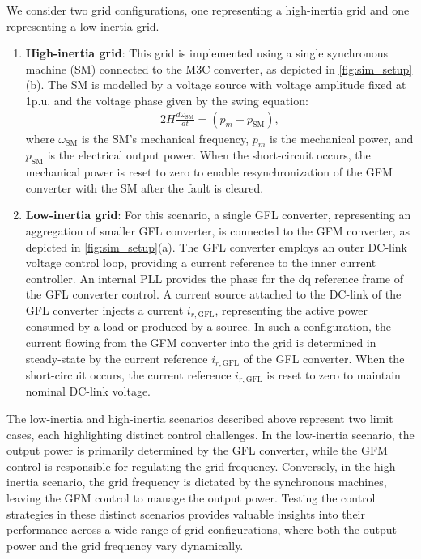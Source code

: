 \documentclass[lettersize,journal]{IEEEtran}
\begin{document}
We consider two grid configurations, one representing a high-inertia grid and one representing a low-inertia grid.
\begin{enumerate}
   \item \textbf{High-inertia grid}: This grid is implemented using a single synchronous machine (SM) connected to the M3C converter, as depicted in \cref{fig:sim_setup}(b).
   The SM is modelled by a voltage source with voltage amplitude fixed at 1p.u. and the voltage phase given by the swing equation:
   \begin{align}
      2H \frac{d \omega_\text{SM}}{dt} = (p_m - p_\text{SM}),
   \end{align}
   where $\omega_\text{SM}$ is the SM's mechanical frequency, $p_m$ is the mechanical power, and $p_\text{SM}$ is the electrical output power.
   When the short-circuit occurs, the mechanical power is reset to zero to enable resynchronization of the GFM converter with the SM after the fault is cleared.
   \item \textbf{Low-inertia grid}: For this scenario, a single GFL converter, representing an aggregation of smaller GFL converter, is connected to the GFM converter, as depicted in \cref{fig:sim_setup}(a).
   The GFL converter employs an outer DC-link voltage control loop, providing a current reference to the inner current controller.
   An internal PLL provides the phase for the dq reference frame of the GFL converter control.
   A current source attached to the DC-link of the GFL converter injects a current $i_{r,\text{GFL}}$, representing the active power consumed by a load or produced by a source.
   In such a configuration, the current flowing from the GFM converter into the grid is determined in steady-state by the current reference $i_{r,\text{GFL}}$ of the GFL converter.
   When the short-circuit occurs, the current reference $i_{r,\text{GFL}}$ is reset to zero to maintain nominal DC-link voltage.
\end{enumerate}
The low-inertia and high-inertia scenarios described above represent two limit cases, each highlighting distinct control challenges.
In the low-inertia scenario, the output power is primarily determined by the GFL converter, while the GFM control is responsible for regulating the grid frequency.
Conversely, in the high-inertia scenario, the grid frequency is dictated by the synchronous machines, leaving the GFM control to manage the output power.
Testing the control strategies in these distinct scenarios provides valuable insights into their performance across a wide range of grid configurations, where both the output power and the grid frequency vary dynamically.
\end{document}
